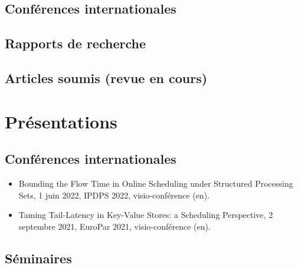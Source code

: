\documentclass[12pt]{article}
\begin{document}
\subsection*{Conférences internationales}


\subsection*{Rapports de recherche}


\subsection*{Articles soumis (revue en cours)}


\section*{Présentations}

\subsection*{Conférences internationales}

\begin{itemize}
  \item \foreignlanguage{english}{Bounding the Flow Time in Online Scheduling under Structured
  Processing Sets}, 1 juin 2022, IPDPS 2022, visio-conférence (en).
  \item \foreignlanguage{english}{Taming Tail-Latency in Key-Value Stores: a Scheduling
  Perspective}, 2 septembre 2021, EuroPar 2021, visio-conférence (en).
\end{itemize}

\subsection*{Séminaires}
\end{document}
